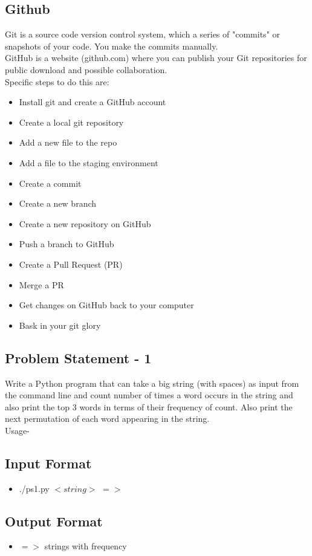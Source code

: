 \documentclass[11pt]{article}
\begin{document}
\begin{flushleft}
\subsection{Github}
Git is a source code version control system, which a series of "commits" or snapshots of your code. You make the commits manually.\\
GitHub is a website (github.com) where you can publish your Git repositories for public download and possible collaboration.\\\bigskip
Specific steps to do this are:
\begin{itemize}
\item Install git and create a GitHub account 
\item Create a local git repository 
\item Add a new file to the repo
\item Add a file to the staging environment
\item Create a commit
\item Create a new branch
\item Create a new repository on GitHub
\item Push a branch to GitHub
\item Create a Pull Request (PR)
\item Merge a PR
\item Get changes on GitHub back to your computer
\item Bask in your git glory
\end{itemize}
\end{flushleft}
\newpage

\begin{center}
\section{Problem Statement­ - 1}
\end{center}
\bigskip
\begin{flushleft}
Write a Python program that can take a big string (with spaces) as input from the command line and count number of times a word occurs in the string and also print the top 3 words in terms of their frequency of count.
Also print the next permutation of each word appearing in the string.\\
\bigskip
Usage-
\subsection{Input Format}
\begin{itemize}
\item ./ps1.py  $<string>$       $=>$    
\end{itemize}
\subsection{Output Format}
\begin{itemize}
\item      $=>$ strings with frequency 
\end{itemize}
\end{flushleft}
\newpage
\end{document}
